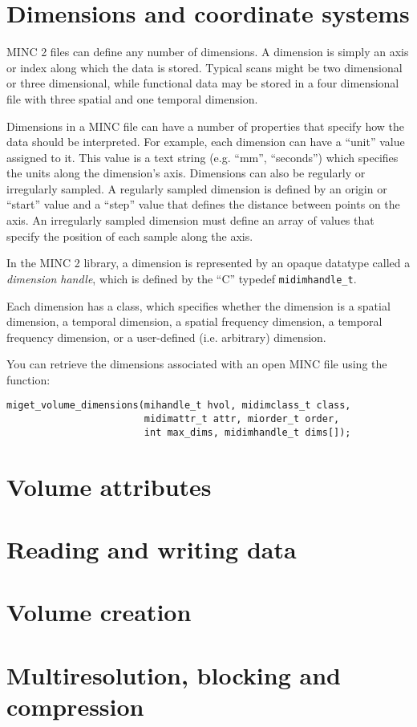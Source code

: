 \documentclass{article}
\begin{document}
\section{Dimensions and coordinate systems}
MINC 2 files can define any number of dimensions.  A dimension is simply
an axis or index along which the data is stored.  Typical scans might be
two dimensional or three dimensional, while functional data may be stored
in a four dimensional file with three spatial and one temporal dimension.

Dimensions in a MINC file can have a number of properties that specify
how the data should be interpreted.  For example, each dimension can
have a ``unit'' value assigned to it.  This value is a text string
(e.g. ``mm'', ``seconds'') which specifies the units along the
dimension's axis.  Dimensions can also be regularly or irregularly
sampled.  A regularly sampled dimension is defined by an origin or
``start'' value and a ``step'' value that defines the distance between
points on the axis.  An irregularly sampled dimension must define an
array of values that specify the position of each sample along the
axis.

In the MINC 2 library, a dimension is represented by an opaque datatype
called a \emph{dimension handle}, which is defined by the ``C'' typedef
{\tt midimhandle\_t}.

Each dimension has a class, which specifies whether the dimension is 
a spatial dimension, a temporal dimension, a spatial frequency dimension,
a temporal frequency dimension, or a user-defined (i.e. arbitrary) dimension.

You can retrieve the dimensions associated with an open MINC file using
the function:\\
\begin{verbatim}
miget_volume_dimensions(mihandle_t hvol, midimclass_t class,
                        midimattr_t attr, miorder_t order,
                        int max_dims, midimhandle_t dims[]);
\end{verbatim}
                             
\section{Volume attributes}
\section{Reading and writing data}
\section{Volume creation}
\section{Multiresolution, blocking and compression}
\end{document}
